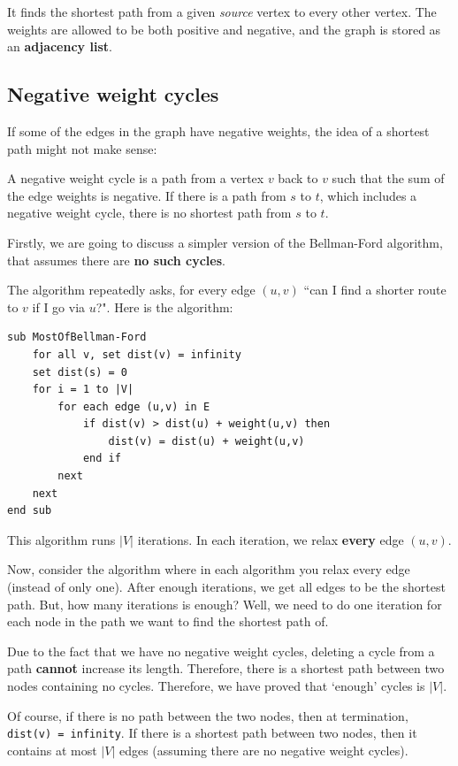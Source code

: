 \documentclass[11pt,a4paper,titlepage,dvipsnames,cmyk]{scrartcl}
\begin{document}
It finds the shortest path from a given \textit{source} vertex to every
other vertex. The weights are allowed to be both positive and negative,
and the graph is stored as an \textbf{adjacency list}.

\subsection{Negative weight cycles}%
\label{sub:negative-cycles}
If some of the edges in the graph have negative weights, the idea of a
shortest path might not make sense:


A negative weight cycle is a path from a vertex $v$ back to $v$ such that
the sum of the edge weights is negative. If there is a path from $s$ to
$t$, which includes a negative weight cycle, there is no shortest path
from $s$ to $t$.

Firstly, we are going to discuss a simpler version of the Bellman-Ford
algorithm, that assumes there are \textbf{no such cycles}.

The algorithm repeatedly asks, for every edge $(u,v)$ ``can I find a
shorter route to $v$ if I go via $u$?". Here is the algorithm:

\begin{lstlisting}
sub MostOfBellman-Ford
    for all v, set dist(v) = infinity
    set dist(s) = 0
    for i = 1 to |V|
        for each edge (u,v) in E
            if dist(v) > dist(u) + weight(u,v) then
                dist(v) = dist(u) + weight(u,v)
            end if
        next
    next
end sub 
\end{lstlisting}

This algorithm runs $|V|$ iterations. In each iteration, we relax
\textbf{every} edge $(u,v)$.

Now, consider the algorithm where in each algorithm you relax every edge
(instead of only one). After enough iterations, we get all edges to be the
shortest path. But, how many iterations is enough? Well, we need to do one
iteration for each node in the path we want to find the shortest path of.

Due to the fact that we have no negative weight cycles, deleting a cycle
from a path \textbf{cannot} increase its length. Therefore, there is a
shortest path between two nodes containing no cycles.  Therefore, we have
proved that `enough' cycles is $|V|$.

Of course, if there is no path between the two nodes, then at termination,
\lstinline|dist(v) = infinity|. If there is a shortest path between two
nodes, then it contains at most $|V|$ edges (assuming there are no
negative weight cycles).
\end{document}

